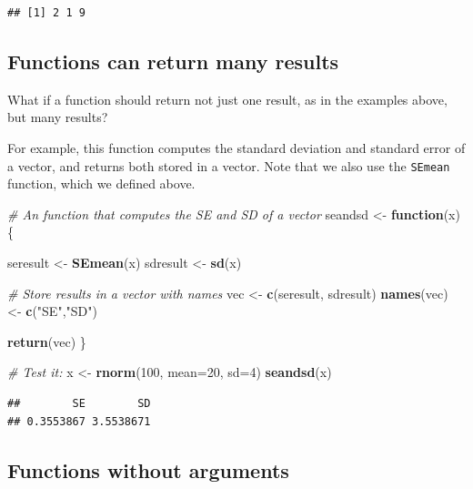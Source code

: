 \documentclass[]{book}
\newenvironment{Shaded}{\begin{snugshade}}{\end{snugshade}}
\newcommand{\CommentTok}[1]{\textcolor[rgb]{0.56,0.35,0.01}{\textit{#1}}}
\newcommand{\ControlFlowTok}[1]{\textcolor[rgb]{0.13,0.29,0.53}{\textbf{#1}}}
\newcommand{\DataTypeTok}[1]{\textcolor[rgb]{0.13,0.29,0.53}{#1}}
\newcommand{\DecValTok}[1]{\textcolor[rgb]{0.00,0.00,0.81}{#1}}
\newcommand{\KeywordTok}[1]{\textcolor[rgb]{0.13,0.29,0.53}{\textbf{#1}}}
\newcommand{\NormalTok}[1]{#1}
\newcommand{\StringTok}[1]{\textcolor[rgb]{0.31,0.60,0.02}{#1}}
\begin{document}
\begin{verbatim}
## [1] 2 1 9
\end{verbatim}

\hypertarget{functions-can-return-many-results}{%
\subsection{Functions can return many results}\label{functions-can-return-many-results}}

What if a function should return not just one result, as in the examples above, but many results?

For example, this function computes the standard deviation and standard error of a vector, and returns both stored in a vector. Note that we also use the \texttt{SEmean} function, which we defined above.

\begin{Shaded}
\begin{Highlighting}[]
\CommentTok{# An function that computes the SE and SD of a vector}
\NormalTok{seandsd <-}\StringTok{ }\ControlFlowTok{function}\NormalTok{(x)\{}
  
\NormalTok{  seresult <-}\StringTok{ }\KeywordTok{SEmean}\NormalTok{(x)}
\NormalTok{  sdresult <-}\StringTok{ }\KeywordTok{sd}\NormalTok{(x)}

  \CommentTok{# Store results in a vector with names}
\NormalTok{  vec <-}\StringTok{ }\KeywordTok{c}\NormalTok{(seresult, sdresult)}
  \KeywordTok{names}\NormalTok{(vec) <-}\StringTok{ }\KeywordTok{c}\NormalTok{(}\StringTok{"SE"}\NormalTok{,}\StringTok{"SD"}\NormalTok{)}

\KeywordTok{return}\NormalTok{(vec)}
\NormalTok{\}}

\CommentTok{# Test it:}
\NormalTok{x <-}\StringTok{ }\KeywordTok{rnorm}\NormalTok{(}\DecValTok{100}\NormalTok{, }\DataTypeTok{mean=}\DecValTok{20}\NormalTok{, }\DataTypeTok{sd=}\DecValTok{4}\NormalTok{)}
\KeywordTok{seandsd}\NormalTok{(x)}
\end{Highlighting}
\end{Shaded}

\begin{verbatim}
##        SE        SD 
## 0.3553867 3.5538671
\end{verbatim}

\hypertarget{functions-without-arguments}{%
\subsection{Functions without arguments}\label{functions-without-arguments}}
\end{document}
